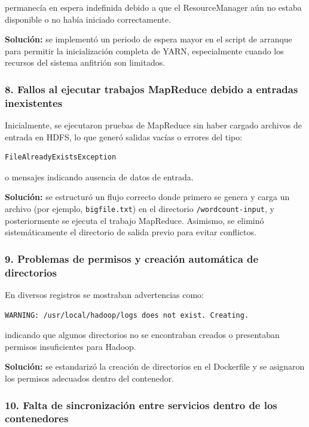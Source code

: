permanecía en espera indefinida debido a que el ResourceManager aún no estaba disponible o no había iniciado correctamente.

\textbf{Solución:} se implementó un periodo de espera mayor en el script de arranque para permitir la inicialización completa de YARN, especialmente cuando los recursos del sistema anfitrión son limitados.

\subsubsection*{8. Fallos al ejecutar trabajos MapReduce debido a entradas inexistentes}

Inicialmente, se ejecutaron pruebas de MapReduce sin haber cargado archivos de entrada en HDFS, lo que generó salidas vacías o errores del tipo:

\begin{verbatim}
FileAlreadyExistsException
\end{verbatim}

o mensajes indicando ausencia de datos de entrada.

\textbf{Solución:} se estructuró un flujo correcto donde primero se genera y carga un archivo (por ejemplo, \texttt{bigfile.txt}) en el directorio \texttt{/wordcount-input}, y posteriormente se ejecuta el trabajo MapReduce. Asimismo, se eliminó sistemáticamente el directorio de salida previo para evitar conflictos.

\subsubsection*{9. Problemas de permisos y creación automática de directorios}

En diversos registros se mostraban advertencias como:

\begin{verbatim}
WARNING: /usr/local/hadoop/logs does not exist. Creating.
\end{verbatim}

indicando que algunos directorios no se encontraban creados o presentaban permisos insuficientes para Hadoop.

\textbf{Solución:} se estandarizó la creación de directorios en el Dockerfile y se asignaron los permisos adecuados dentro del contenedor.

\subsubsection*{10. Falta de sincronización entre servicios dentro de los contenedores}

